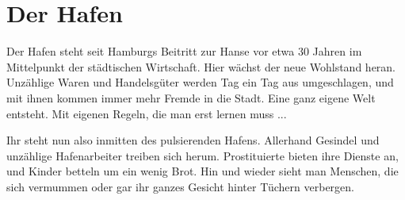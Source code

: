 
\chapter{Der Hafen}
\label{chap:hafen}

\begin{advquote}
\large Der Hafen steht seit Hamburgs Beitritt zur Hanse vor etwa 30 Jahren im
Mittelpunkt der städtischen Wirtschaft. Hier wächst der neue Wohlstand heran.
Unzählige Waren und Handelsgüter werden Tag ein Tag aus umgeschlagen, und mit ihnen
kommen immer mehr Fremde in die Stadt. Eine ganz eigene Welt entsteht. Mit eigenen
Regeln, die man erst lernen muss ...

Ihr steht nun also inmitten des pulsierenden Hafens. Allerhand Gesindel und unzählige
Hafenarbeiter treiben sich herum. Prostituierte bieten ihre Dienste an, und Kinder
betteln um ein wenig Brot. Hin und wieder sieht man Menschen, die sich vermummen
oder gar ihr ganzes Gesicht hinter Tüchern verbergen.
\end{advquote}

